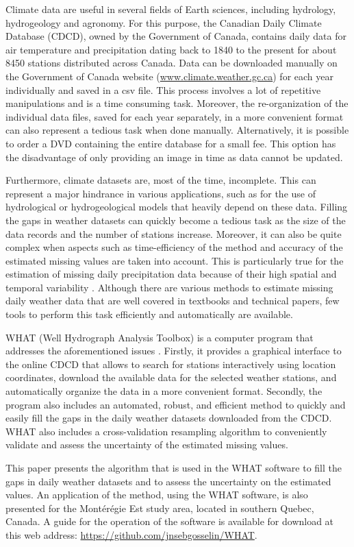 \documentclass[ARTICLETHERMIC.tex]{subfiles}
\begin{document}
Climate data are useful in several fields of Earth sciences, including hydrology, hydrogeology and agronomy. For this purpose, the Canadian Daily Climate Database (CDCD), owned by the Government of Canada, contains daily data for air temperature and precipitation dating back to 1840 to the present for about 8450 stations distributed across Canada. Data can be downloaded manually on the Government of Canada website (\url{www.climate.weather.gc.ca}) for each year individually and saved in a csv file. This process involves a lot of repetitive manipulations and is a time consuming task. Moreover, the re-organization of the individual data files, saved for each year separately, in a more convenient format can also represent a tedious task when done manually. Alternatively, it is possible to order a DVD containing the entire database for a small fee. This option has the disadvantage of only providing an image in time as data cannot be updated.  

Furthermore, climate datasets are, most of the time, incomplete. This can represent a major hindrance in various applications, such as for the use of hydrological or hydrogeological models that heavily depend on these data. Filling the gaps in weather datasets can quickly become a tedious task as the size of the data records and the number of stations increase. Moreover, it can also be quite complex when aspects such as time-efficiency of the method and accuracy of the estimated missing values are taken into account. This is particularly true for the estimation of missing daily precipitation data because of their high spatial and temporal variability \citep{simolo_improving_2010}. Although there are various methods to estimate missing daily weather data that are well covered in textbooks and technical papers, few tools to perform this task efficiently and automatically are available. 

WHAT (Well Hydrograph Analysis Toolbox) is a computer program that addresses the aforementioned issues \citep{gosselin_user_2015}. Firstly, it provides a graphical interface to the online CDCD that allows to search for stations interactively using location coordinates, download the available data for the selected weather stations, and automatically organize the data in a more convenient format. Secondly, the program also includes an automated, robust, and efficient method to quickly and easily fill the gaps in the daily weather datasets downloaded from the CDCD. WHAT also includes a cross-validation resampling algorithm to conveniently validate and assess the uncertainty of the estimated missing values.

This paper presents the algorithm that is used in the WHAT software to fill the gaps in daily weather datasets and to assess the uncertainty on the estimated values. An application of the method, using the WHAT software, is also presented for the Mont\'er\'egie Est study area, located in southern Quebec, Canada. A guide for the operation of the software \cite{gosselin_what_2015} is available for download at this web address:  \url{https://github.com/jnsebgosselin/WHAT}.
\end{document}
